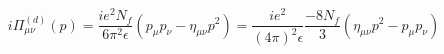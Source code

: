 \begin{equation}
i\Pi^{(d)}_{\mu\nu}(p)=\frac{ie^{2}N_{f}}{6\pi^{2}\epsilon}(p_{\mu}p_{\nu}-\eta_{\mu\nu}p^{2})
=\frac{ie^{2}}{(4\pi)^{2}\epsilon}\frac{-8N_{f}}{3}(\eta_{\mu\nu}p^{2}-p_{\mu}p_{\nu})
  \end{equation}

